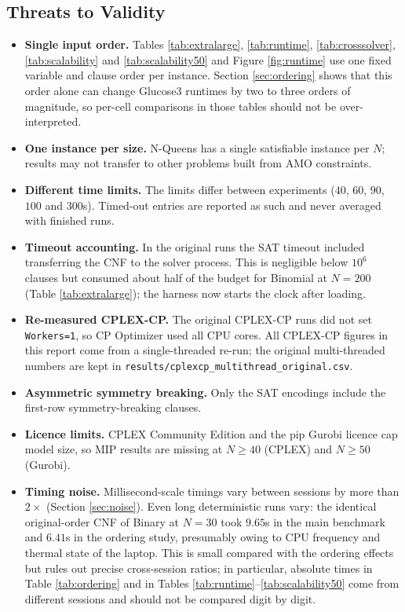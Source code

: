 \documentclass[a4paper,fleqn]{cas-sc}
\begin{document}
\subsection{Threats to Validity}
\label{sec:threats}
\begin{itemize}
    \setlength{\itemsep}{1pt}
    \setlength{\parskip}{0pt}
    \item \textbf{Single input order.} Tables \ref{tab:extralarge}, \ref{tab:runtime}, \ref{tab:crosssolver}, \ref{tab:scalability} and \ref{tab:scalability50} and Figure \ref{fig:runtime} use one fixed variable and clause order per instance. Section \ref{sec:ordering} shows that this order alone can change Glucose3 runtimes by two to three orders of magnitude, so per-cell comparisons in those tables should not be over-interpreted.
    \item \textbf{One instance per size.} N-Queens has a single satisfiable instance per $N$; results may not transfer to other problems built from AMO constraints.
    \item \textbf{Different time limits.} The limits differ between experiments ($40$, $60$, $90$, $100$ and $300$s). Timed-out entries are reported as such and never averaged with finished runs.
    \item \textbf{Timeout accounting.} In the original runs the SAT timeout included transferring the CNF to the solver process. This is negligible below $10^6$ clauses but consumed about half of the budget for Binomial at $N=200$ (Table \ref{tab:extralarge}); the harness now starts the clock after loading.
    \item \textbf{Re-measured CPLEX-CP.} The original CPLEX-CP runs did not set \texttt{Workers=1}, so CP Optimizer used all CPU cores. All CPLEX-CP figures in this report come from a single-threaded re-run; the original multi-threaded numbers are kept in \texttt{results/cplexcp\_multithread\_original.csv}.
    \item \textbf{Asymmetric symmetry breaking.} Only the SAT encodings include the first-row symmetry-breaking clauses.
    \item \textbf{Licence limits.} CPLEX Community Edition and the pip Gurobi licence cap model size, so MIP results are missing at $N \geq 40$ (CPLEX) and $N \geq 50$ (Gurobi).
    \item \textbf{Timing noise.} Millisecond-scale timings vary between sessions by more than $2\times$ (Section \ref{sec:noise}). Even long deterministic runs vary: the identical original-order CNF of Binary at $N=30$ took $9.65$s in the main benchmark and $6.41$s in the ordering study, presumably owing to CPU frequency and thermal state of the laptop. This is small compared with the ordering effects but rules out precise cross-session ratios; in particular, absolute times in Table \ref{tab:ordering} and in Tables \ref{tab:runtime}--\ref{tab:scalability50} come from different sessions and should not be compared digit by digit.
\end{itemize}
\end{document}
